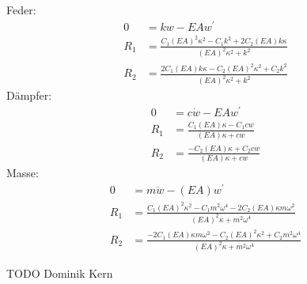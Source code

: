 \begin{solution}
        Feder:
        \begin{align*}
        0 &= kw - EA  w^{'}\\
        R_1 &= \frac{C_1 {(EA)}^2 \kappa^2 - C_1 k^2 + 2C_2 (EA) k \kappa}{{(EA)}^2 \kappa^2 + k^2}\\
        R_2 &= \frac{2C_1 (EA) k \kappa - C_2 {(EA)}^2 \kappa^2 + C_2 k^2}{{(EA)}^2 \kappa^2 + k^2}
        \end{align*}
        Dämpfer:
        \begin{align*}
        0 &= c \dot{w} - EA  w^{'}\\
        R_1 &= \frac{C_1 (EA) \kappa - C_1 c w}{(EA) \kappa + cw}\\
        R_2 &= \frac{-C_2 (EA) \kappa + C_2 cw}{(EA) \kappa + cw}
        \end{align*}
        Masse:
        \begin{align*}
        0 &= m \ddot{w} - (EA) w^{'}\\
        R_1 &= \frac{C_1 {(EA)}^2 \kappa^2 - C_1 m^2 \omega^4 - 2C_2 (EA) \kappa m \omega^2}{{(EA)}^2 \kappa + m^2 \omega^4}\\
        R_2 &= \frac{-2C_1 (EA) \kappa m \omega^2 - C_2 {(EA)}^2 \kappa^2 + C_2 m^2 \omega^4}{{(EA)}^2 \kappa + m^2 \omega^4}
    \end{align*}
\end{solution}

TODO Dominik Kern

\vspace{1cm}



